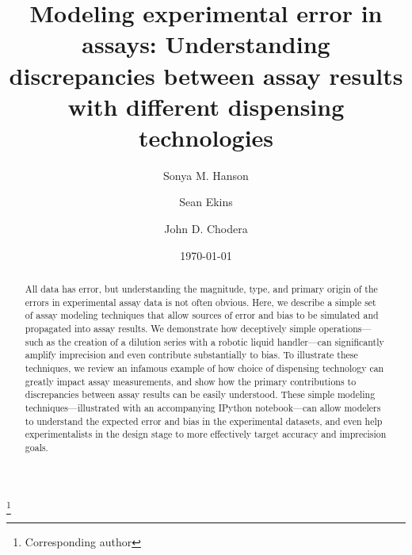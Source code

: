\documentclass[aps,pre,twocolumn,nofootinbib,superscriptaddress,linenumbers]{revtex4-1}
\begin{document}
\title{Modeling experimental error in assays: Understanding discrepancies between assay results with different dispensing technologies}

\author{Sonya M. Hanson}
\author{Sean Ekins}
\author{John D. Chodera}
 \thanks{Corresponding author}

\date{\today}

\begin{abstract}

All data has error, but understanding the magnitude, type, and primary origin of the errors in experimental assay data is not often obvious.
Here, we describe a simple set of assay modeling techniques that allow sources of error and bias to be simulated and propagated into assay results.
We demonstrate how deceptively simple operations---such as the creation of a dilution series with a robotic liquid handler---can significantly amplify imprecision and even contribute substantially to bias.
To illustrate these techniques, we review an infamous example of how choice of dispensing technology can greatly impact assay measurements, and show how the primary contributions to discrepancies between assay results can be easily understood.
These simple modeling techniques---illustrated with an accompanying IPython notebook---can allow modelers to understand the expected error and bias in the experimental datasets, and even help experimentalists in the design stage to more effectively target accuracy and imprecision goals.

\end{abstract}

\maketitle

\end{document}
